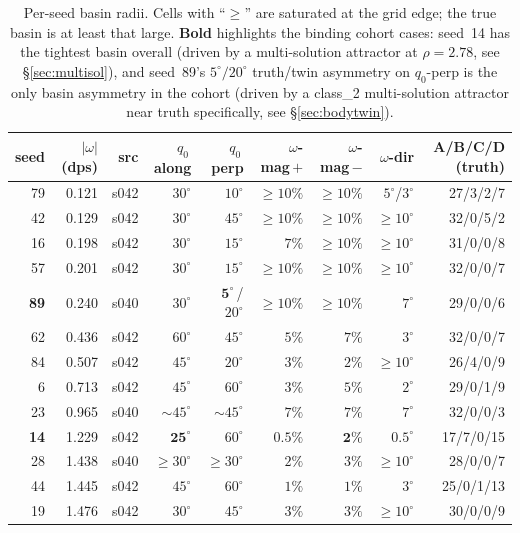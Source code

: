 \documentclass[11pt,a4paper]{article}
\begin{document}
\begin{table}[t]
\centering
\small
\begin{tabular}{rrrrrrrrr}
\toprule
seed & $|\omega|$ (dps) & src & $q_0$\,along & $q_0$\,perp & $\omega$-mag\,$+$ & $\omega$-mag\,$-$ & $\omega$-dir & A/B/C/D (truth) \\
\midrule
79 & 0.121 & s042 & $30^\circ$ & $10^\circ$ & $\geq 10\%$ & $\geq 10\%$ & $5^\circ$/$3^\circ$ & 27/3/2/7 \\
42 & 0.129 & s042 & $30^\circ$ & $45^\circ$ & $\geq 10\%$ & $\geq 10\%$ & $\geq 10^\circ$ & 32/0/5/2 \\
16 & 0.198 & s042 & $30^\circ$ & $15^\circ$ & $7\%$ & $\geq 10\%$ & $\geq 10^\circ$ & 31/0/0/8 \\
57 & 0.201 & s042 & $30^\circ$ & $15^\circ$ & $\geq 10\%$ & $\geq 10\%$ & $\geq 10^\circ$ & 32/0/0/7 \\
\textbf{89} & 0.240 & s040 & $30^\circ$ & $\mathbf{5^\circ}$\,/$20^\circ$ & $\geq 10\%$ & $\geq 10\%$ & $7^\circ$ & 29/0/0/6 \\
62 & 0.436 & s042 & $60^\circ$ & $45^\circ$ & $5\%$ & $7\%$ & $3^\circ$ & 32/0/0/7 \\
84 & 0.507 & s042 & $45^\circ$ & $20^\circ$ & $3\%$ & $2\%$ & $\geq 10^\circ$ & 26/4/0/9 \\
6  & 0.713 & s042 & $45^\circ$ & $60^\circ$ & $3\%$ & $5\%$ & $2^\circ$ & 29/0/1/9 \\
23 & 0.965 & s040 & $\sim 45^\circ$ & $\sim 45^\circ$ & $7\%$ & $7\%$ & $7^\circ$ & 32/0/0/3 \\
\textbf{14} & 1.229 & s042 & $\mathbf{25^\circ}$ & $60^\circ$ & $\mathbf{0.5\%}$ & $\mathbf{2\%}$ & $\mathbf{0.5^\circ}$ & 17/7/0/15 \\
28 & 1.438 & s040 & $\geq 30^\circ$ & $\geq 30^\circ$ & $2\%$ & $3\%$ & $\geq 10^\circ$ & 28/0/0/7 \\
44 & 1.445 & s042 & $45^\circ$ & $60^\circ$ & $1\%$ & $1\%$ & $3^\circ$ & 25/0/1/13 \\
19 & 1.476 & s042 & $30^\circ$ & $45^\circ$ & $3\%$ & $3\%$ & $\geq 10^\circ$ & 30/0/0/9 \\
\bottomrule
\end{tabular}
\caption{Per-seed basin radii. Cells with ``$\geq$'' are saturated at the grid edge; the true basin is at least that large. \textbf{Bold} highlights the binding cohort cases: seed~14 has the tightest basin overall (driven by a multi-solution attractor at $\rho{=}2.78$, see \S\ref{sec:multisol}), and seed~89's $5^\circ/20^\circ$ truth/twin asymmetry on $q_0$-perp is the only basin asymmetry in the cohort (driven by a class\_2 multi-solution attractor near truth specifically, see \S\ref{sec:bodytwin}).}
\label{tab:cohort_basins}
\end{table}
\end{document}
